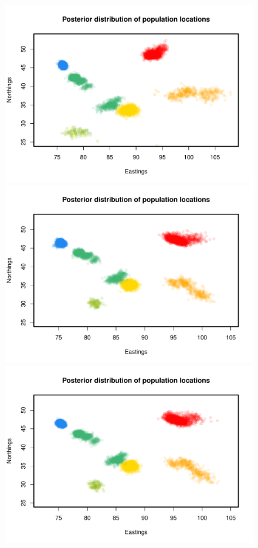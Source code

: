 \documentclass[10pt,letterpaper]{article}
\begin{document}
\begin{figure}
	\centering
			{\includegraphics[height=.3\textheight]{../figs/warblers/warb_inds_ad_post_map_randpr2.pdf}}
			{\includegraphics[height=.3\textheight]{../figs/warblers/warb_inds_ad_post_map_realpr1.pdf}}
			{\includegraphics[height=.3\textheight]{../figs/warblers/warb_inds_ad_post_map_realpr2.pdf}}

\end{figure}
\end{document}
